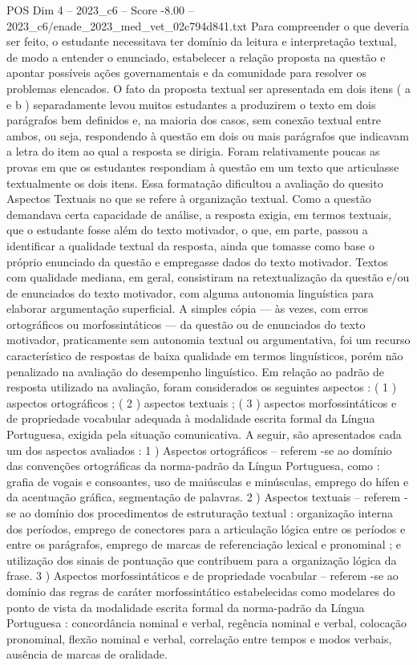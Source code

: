 \begin{textsample}{POS Dim 4 – 2023\_c6 – Score -8.00 – 2023\_c6/enade\_2023\_med\_vet\_02c794d841.txt}
Para compreender o que deveria ser feito, o estudante necessitava ter domínio da leitura e interpretação textual, de modo a entender o enunciado, estabelecer a relação proposta na questão e apontar possíveis ações governamentais e da comunidade para resolver os problemas elencados.
O fato da proposta textual ser apresentada em dois itens ( a e b ) separadamente levou muitos estudantes a produzirem o texto em dois parágrafos bem definidos e, na maioria dos casos, sem conexão textual entre ambos, ou seja, respondendo à questão em dois ou mais parágrafos que indicavam a letra do item ao qual a resposta se dirigia.
Foram relativamente poucas as provas em que os estudantes respondiam à questão em um texto que articulasse textualmente os dois itens.
Essa formatação dificultou a avaliação do quesito Aspectos Textuais no que se refere à organização textual.
Como a questão demandava certa capacidade de análise, a resposta exigia, em termos textuais, que o estudante fosse além do texto motivador, o que, em parte, passou a identificar a qualidade textual da resposta, ainda que tomasse como base o próprio enunciado da questão e empregasse dados do texto motivador.
Textos com qualidade mediana, em geral, consistiram na retextualização da questão e/ou de enunciados do texto motivador, com alguma autonomia linguística para elaborar argumentação superficial.
A simples cópia — às vezes, com erros ortográficos ou morfossintáticos — da questão ou de enunciados do texto motivador, praticamente sem autonomia textual ou argumentativa, foi um recurso característico de respostas de baixa qualidade em termos linguísticos, porém não penalizado na avaliação do desempenho linguístico.
Em relação ao padrão de resposta utilizado na avaliação, foram considerados os seguintes aspectos : ( 1 ) aspectos ortográficos ; ( 2 ) aspectos textuais ; ( 3 ) aspectos morfossintáticos e de propriedade vocabular adequada à modalidade escrita formal da Língua Portuguesa, exigida pela situação comunicativa.
A seguir, são apresentados cada um dos aspectos avaliados : 1 ) Aspectos ortográficos – referem -se ao domínio das convenções ortográficas da norma-padrão da Língua Portuguesa, como : grafia de vogais e consoantes, uso de maiúsculas e minúsculas, emprego do hífen e da acentuação gráfica, segmentação de palavras. 2 ) Aspectos textuais – referem -se ao domínio dos procedimentos de estruturação textual : organização interna dos períodos, emprego de conectores para a articulação lógica entre os períodos e entre os parágrafos, emprego de marcas de referenciação lexical e pronominal ; e utilização dos sinais de pontuação que contribuem para a organização lógica da frase. 3 ) Aspectos morfossintáticos e de propriedade vocabular – referem -se ao domínio das regras de caráter morfossintático estabelecidas como modelares do ponto de vista da modalidade escrita formal da norma-padrão da Língua Portuguesa : concordância nominal e verbal, regência nominal e verbal, colocação pronominal, flexão nominal e verbal, correlação entre tempos e modos verbais, ausência de marcas de oralidade.

\end{textsample}
